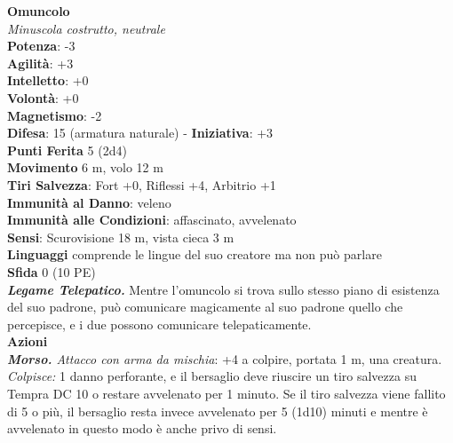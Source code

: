 \begin{multicols}{2}
\medskip\textbf{Omuncolo}\\
\emph{Minuscola costrutto, neutrale}\\
\textbf{Potenza}: -3\\
\textbf{Agilità}: +3\\
\textbf{Intelletto}: +0\\
\textbf{Volontà}: +0\\
\textbf{Magnetismo}: -2\\
\textbf{Difesa}: 15 (armatura naturale) - \textbf{Iniziativa}: +3\\
\textbf{Punti Ferita} 5 (2d4)\\
\textbf{Movimento} 6 m, volo 12 m\\
\textbf{Tiri Salvezza}:  Fort +0, Riflessi +4, Arbitrio +1\\
\textbf{Immunità al Danno}: veleno\\
\textbf{Immunità alle Condizioni}: affascinato, avvelenato\\
\textbf{Sensi}: Scurovisione 18 m, vista cieca 3 m\\
\textbf{Linguaggi} comprende le lingue del suo creatore ma non può parlare\\
\textbf{Sfida} 0 (10 PE)\smallskip\\
\emph{\textbf{Legame Telepatico.}} Mentre l'omuncolo si trova sullo stesso piano di esistenza del suo padrone, può comunicare magicamente al suo padrone quello che percepisce, e i due possono comunicare telepaticamente.\\
\smallskip\textbf{Azioni}\\
\emph{\textbf{Morso.} Attacco con arma da mischia}: +4 a colpire, portata 1 m, una creatura.\\
\emph{Colpisce:} 1 danno perforante, e il bersaglio deve riuscire un tiro salvezza su Tempra DC 10 o restare avvelenato per 1 minuto. Se il tiro salvezza viene fallito di 5 o più, il bersaglio resta invece avvelenato per 5 (1d10) minuti e mentre è avvelenato in questo modo è anche privo di sensi.\\


\end{multicols}
